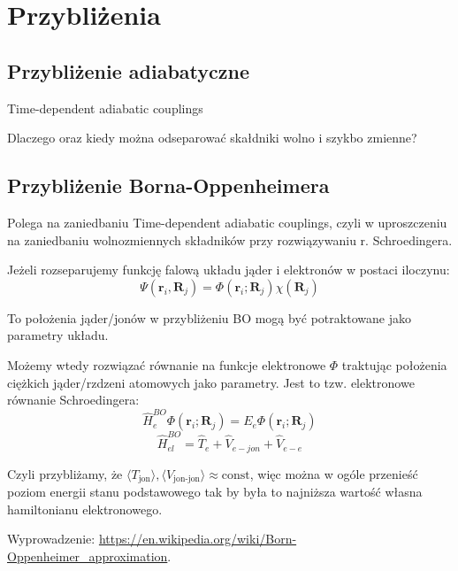 
\section{Przybliżenia}


\subsection{Przybliżenie adiabatyczne}

Time-dependent adiabatic couplings

Dlaczego oraz kiedy można odseparować skałdniki wolno i szykbo zmienne?


\subsection{Przybliżenie Borna-Oppenheimera}

Polega na zaniedbaniu Time-dependent adiabatic couplings, czyli w
uproszczeniu na zaniedbaniu wolnozmiennych składników przy rozwiązywaniu
r. Schroedingera.

Jeżeli rozseparujemy funkcję falową układu jąder i elektronów w postaci
iloczynu: 
\[
\Psi\left(\boldsymbol{r}_{i},\boldsymbol{R}_{j}\right)=\Phi\left(\boldsymbol{r}_{i};\boldsymbol{R}_{j}\right)\chi\left(\boldsymbol{R}_{j}\right)
\]


To położenia jąder/jonów w przybliżeniu BO mogą być potraktowane jako
parametry układu.

Możemy wtedy rozwiązać równanie na funkcje elektronowe $\Phi$ traktując
położenia ciężkich jąder/rzdzeni atomowych jako parametry. Jest to
tzw. elektronowe równanie Schroedingera:
\[
\hat{H}_{e}^{BO}\Phi\left(\boldsymbol{r}_{i};\boldsymbol{R}_{j}\right)=E_{e}\Phi\left(\boldsymbol{r}_{i};\boldsymbol{R}_{j}\right)
\]
\[
\hat{H}_{el}^{BO}= \hat{T}_e + \hat{V}_{e-jon} + \hat{V}_{e-e}
\]

Czyli przybliżamy, że $ \langle T_{\text{jon}} \rangle, \langle V_{\text{jon-jon}} \rangle \approx \text{const}$, więc można w ogóle przenieść poziom energii stanu podstawowego tak by była to najniższa wartość własna hamiltonianu elektronowego.

Wyprowadzenie: \href{https://en.wikipedia.org/wiki/Born\%E2\%80\%93Oppenheimer_approximation}{https://en.wikipedia.org/wiki/Born-Oppenheimer\_{}approximation}.


